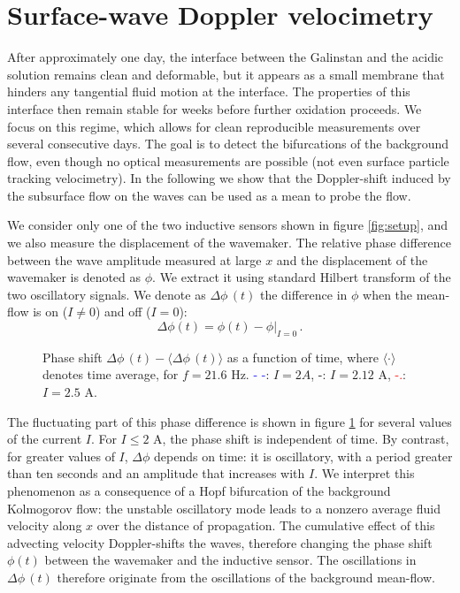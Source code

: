 \documentclass[doublecol]{epl2} %
\begin{document}
\section{Surface-wave Doppler velocimetry}

After approximately one day, the interface between the Galinstan and the acidic solution remains clean and deformable, but it appears as a small membrane that hinders any tangential fluid motion at the interface. The properties of this interface then remain stable for weeks before further oxidation proceeds. We focus on this regime, which allows for clean reproducible measurements over several consecutive days. The goal is to detect the bifurcations of the background flow, even though no optical measurements are possible (not even surface particle tracking velocimetry). In the following we show that the Doppler-shift induced by the subsurface flow on the waves can be used as a mean to probe the flow.

We consider only one of the two inductive sensors shown in figure \ref{fig:setup}, and we also measure the displacement of the wavemaker. The relative phase difference between the wave amplitude measured at large $x$ and the displacement of the wavemaker is denoted as $\phi$. We extract it using standard Hilbert transform of the two oscillatory signals. We denote as $\Delta \phi \, (t)$ the difference in $\phi$ when the mean-flow is on ($I \neq 0$) and off ($I=0$):
\begin{equation}
\Delta \phi (t)= \phi(t)-\phi|_{I=0} \, .
\end{equation}

\begin{figure}[t]
          \caption{Phase shift $\Delta \phi \, (t)-\langle\Delta \phi \, (t)\rangle$ as a function of time, where $\langle \cdot \rangle$ denotes time average, for $f=21.6$ Hz. \textcolor{blue}{- -}: $I=2A$, \textcolor{black}{-}: $I=2.12$ A, \textcolor{red}{-.}: $I=2.5$ A.
    \label{fig:time_signal}}
\end{figure}

The fluctuating part of this phase difference is shown in figure \ref{fig:time_signal} for several values of the current $I$. For $I \leq 2$ A, the phase shift is independent of time. By contrast, for greater values of $I$, $\Delta\phi$ depends on time: it is oscillatory, with a period greater than ten seconds and an amplitude that increases with $I$. We interpret this phenomenon as a consequence of a Hopf bifurcation of the background Kolmogorov flow: the unstable oscillatory mode leads to a nonzero average fluid velocity along $x$ over the distance of propagation. The cumulative effect of this advecting velocity Doppler-shifts the waves, therefore changing the phase shift $\phi(t)$ between the wavemaker and the inductive sensor. The oscillations in $\Delta \phi \, (t)$ therefore originate from the oscillations of the background mean-flow.
\end{document}
